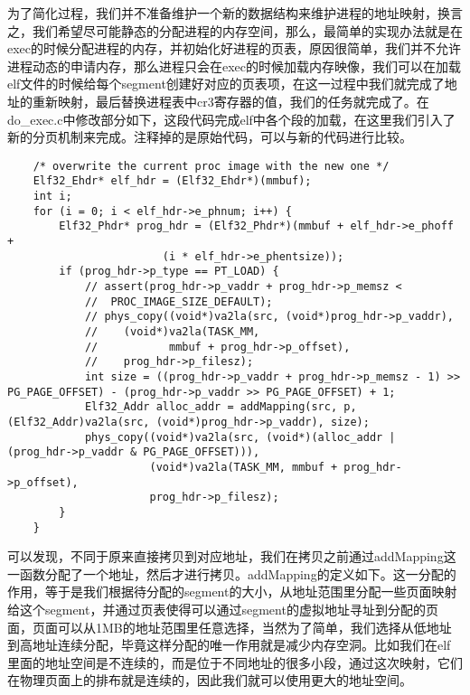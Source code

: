 \documentclass{whureport}
\begin{document}
为了简化过程，我们并不准备维护一个新的数据结构来维护进程的地址映射，换言之，我们希望尽可能静态的分配进程的内存空间，那么，最简单的实现办法就是在exec的时候分配进程的内存，并初始化好进程的页表，原因很简单，我们并不允许进程动态的申请内存，那么进程只会在exec的时候加载内存映像，我们可以在加载elf文件的时候给每个segment创建好对应的页表项，在这一过程中我们就完成了地址的重新映射，最后替换进程表中cr3寄存器的值，我们的任务就完成了。在do\_exec.c中修改部分如下，这段代码完成elf中各个段的加载，在这里我们引入了新的分页机制来完成。注释掉的是原始代码，可以与新的代码进行比较。

\begin{lstlisting}
	/* overwrite the current proc image with the new one */
	Elf32_Ehdr* elf_hdr = (Elf32_Ehdr*)(mmbuf);
	int i;
	for (i = 0; i < elf_hdr->e_phnum; i++) {
		Elf32_Phdr* prog_hdr = (Elf32_Phdr*)(mmbuf + elf_hdr->e_phoff +
			 			(i * elf_hdr->e_phentsize));
		if (prog_hdr->p_type == PT_LOAD) {
            // assert(prog_hdr->p_vaddr + prog_hdr->p_memsz <
            //	PROC_IMAGE_SIZE_DEFAULT);
            // phys_copy((void*)va2la(src, (void*)prog_hdr->p_vaddr),
            //	  (void*)va2la(TASK_MM,
            //			 mmbuf + prog_hdr->p_offset),
            //	  prog_hdr->p_filesz);
            int size = ((prog_hdr->p_vaddr + prog_hdr->p_memsz - 1) >> PG_PAGE_OFFSET) - (prog_hdr->p_vaddr >> PG_PAGE_OFFSET) + 1;
            Elf32_Addr alloc_addr = addMapping(src, p, (Elf32_Addr)va2la(src, (void*)prog_hdr->p_vaddr), size);
            phys_copy((void*)va2la(src, (void*)(alloc_addr | (prog_hdr->p_vaddr & PG_PAGE_OFFSET))),
                      (void*)va2la(TASK_MM, mmbuf + prog_hdr->p_offset),
                      prog_hdr->p_filesz);
        }
	}
\end{lstlisting}


可以发现，不同于原来直接拷贝到对应地址，我们在拷贝之前通过addMapping这一函数分配了一个地址，然后才进行拷贝。addMapping的定义如下。这一分配的作用，等于是我们根据待分配的segment的大小，从地址范围里分配一些页面映射给这个segment，并通过页表使得可以通过segment的虚拟地址寻址到分配的页面，页面可以从1MB的地址范围里任意选择，当然为了简单，我们选择从低地址到高地址连续分配，毕竟这样分配的唯一作用就是减少内存空洞。比如我们在elf里面的地址空间是不连续的，而是位于不同地址的很多小段，通过这次映射，它们在物理页面上的排布就是连续的，因此我们就可以使用更大的地址空间。
\end{document}
